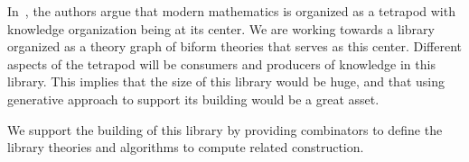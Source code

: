 In~\cite{carette2020bigMath}, the authors argue that modern mathematics is organized as a tetrapod with knowledge organization being at its center. We are working towards a library organized as a theory graph of biform theories that serves as this center. Different aspects of the tetrapod will be consumers and producers of knowledge in this library. This implies that the size of this library would be huge, and that using generative approach to support its building would be a great asset. 

We support the building of this library by providing combinators to define the library theories and algorithms to compute related construction.







